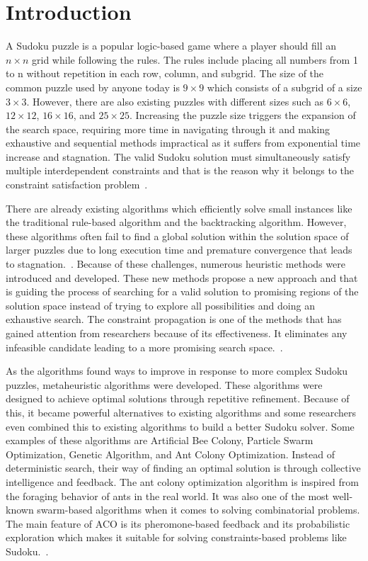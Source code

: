 \chapter{Introduction}\label{chap:intro} 
    A Sudoku puzzle is a popular logic-based game where a player should fill an $n \times n$ grid while following the rules. The rules include placing all numbers from 1 to n without repetition in each row, column, and subgrid. The size of the common puzzle used by anyone today is $9 \times 9$ which consists of a subgrid of a size $3 \times 3$. However, there are also existing puzzles with different sizes such as $6 \times 6$, $12 \times 12$, $16 \times 16$, and $25 \times 25$. Increasing the puzzle size triggers the expansion of the search space, requiring more time in navigating through it and making exhaustive and sequential methods impractical as it suffers from exponential time increase and stagnation. The valid Sudoku solution must simultaneously satisfy multiple interdependent constraints and that is the reason why it belongs to the constraint satisfaction problem~\cite{lloyd2020, simonis2005sudoku,eppstein2006computational,yato2003complexity}. 


    There are already existing algorithms which efficiently solve small instances like the traditional rule-based algorithm and the backtracking algorithm. However, these algorithms often fail to find a global solution within the solution space of larger puzzles due to long execution time and premature convergence that leads to stagnation.~\cite{is2012techniques}. Because of these challenges, numerous heuristic methods were introduced and developed. These new methods propose a new approach and that is guiding the process of searching for a valid solution to promising regions of the solution space instead of trying to explore all possibilities and doing an exhaustive search. The constraint propagation is one of the methods that has gained attention from researchers because of its effectiveness. It eliminates any infeasible candidate leading to a more promising search space.~\cite{lloyd2020}.

    As the algorithms found ways to improve in response to more complex Sudoku puzzles, metaheuristic algorithms were developed. These algorithms were designed to achieve optimal solutions through repetitive refinement. Because of this, it became powerful alternatives to existing algorithms and some researchers even combined this to existing algorithms to build a better Sudoku solver. Some examples of these algorithms are Artificial Bee Colony, Particle Swarm Optimization, Genetic Algorithm, and Ant Colony Optimization. Instead of deterministic search, their way of finding an optimal solution is through collective intelligence and feedback. The ant colony optimization algorithm is inspired from the foraging behavior of ants in the real world. It was also one of the most well-known swarm-based algorithms when it comes to solving combinatorial problems. The main feature of ACO is its pheromone-based feedback and its probabilistic exploration which makes it suitable for solving constraints-based problems like Sudoku.~\cite{dorigo1992}.

